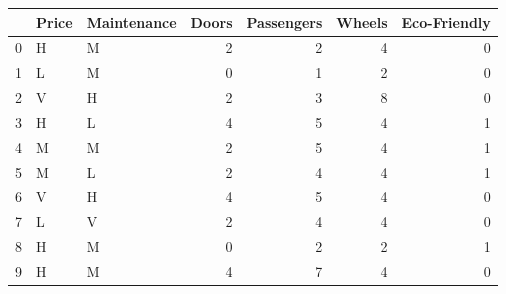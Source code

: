 \begin{tabular}{lllrrrr}
\toprule
{} & Price & Maintenance &  Doors &  Passengers &  Wheels &  Eco-Friendly \\
\midrule
0 &     H &           M &      2 &           2 &       4 &             0 \\
1 &     L &           M &      0 &           1 &       2 &             0 \\
2 &     V &           H &      2 &           3 &       8 &             0 \\
3 &     H &           L &      4 &           5 &       4 &             1 \\
4 &     M &           M &      2 &           5 &       4 &             1 \\
5 &     M &           L &      2 &           4 &       4 &             1 \\
6 &     V &           H &      4 &           5 &       4 &             0 \\
7 &     L &           V &      2 &           4 &       4 &             0 \\
8 &     H &           M &      0 &           2 &       2 &             1 \\
9 &     H &           M &      4 &           7 &       4 &             0 \\
\bottomrule
\end{tabular}
